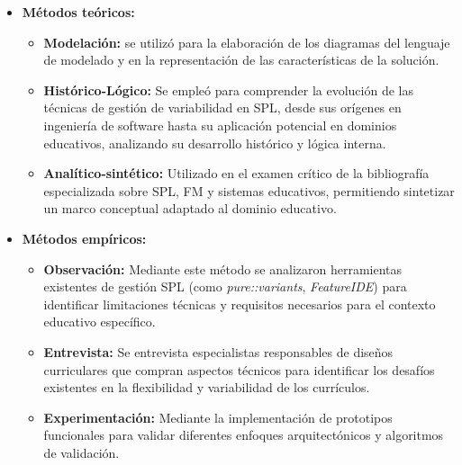 {    \begin{itemize}
        \item \textbf{Métodos teóricos:} 
            \begin{itemize}
                \item \textbf{Modelación:} se utilizó para la elaboración de los diagramas del lenguaje de
                modelado y en la representación de las características de la solución.
                \item \textbf{Histórico-Lógico:} Se empleó para comprender la evolución de las técnicas de
                gestión de variabilidad en \ac{SPL}, desde sus orígenes en ingeniería de software
                hasta su aplicación potencial en dominios educativos, analizando su desarrollo
                histórico y lógica interna.
                \item \textbf{Analítico-sintético:} Utilizado en el examen crítico de la bibliografía
                especializada sobre \ac{SPL}, \ac{FM} y sistemas educativos, permitiendo
                sintetizar un marco conceptual adaptado al dominio educativo.
            \end{itemize}
        \item \textbf{Métodos empíricos:}
            \begin{itemize}
                \item \textbf{Observación:} Mediante este método se analizaron herramientas
                existentes de gestión \ac{SPL} (como \textit{pure::variants}, \textit{FeatureIDE}) para
                identificar limitaciones técnicas y requisitos necesarios para el contexto
                educativo específico.
                \item \textbf{Entrevista:} Se entrevista especialistas responsables de diseños
                curriculares que compran aspectos técnicos para identificar los desafíos
                existentes en la flexibilidad y variabilidad de los currículos.
                \item \textbf{Experimentación:} Mediante la implementación de prototipos
                funcionales para validar diferentes enfoques arquitectónicos y algoritmos
                de validación.
            \end{itemize}
    \end{itemize}
}
% 
